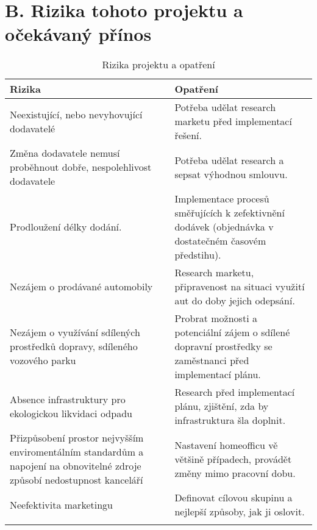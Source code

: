 
\newpage

\section*{B. Rizika tohoto projektu a očekávaný přínos}
\label{sec:Rizika tohoto projektu a ocekavany prinos}

\begin{table}[h]
\centering
\begin{tabularx}{\textwidth}{X|X}
\thickhline
Rizika & Opatření \\ \hline
Neexistující, nebo nevyhovující dodavatelé & Potřeba udělat research marketu před implementací řešení. \\
Změna dodavatele nemusí proběhnout dobře, \newline nespolehlivost dodavatele & Potřeba udělat research a sepsat výhodnou smlouvu. \\
Prodloužení délky dodání. & Implementace procesů směřujících k zefektivnění dodávek (objednávka v dostatečném časovém předstihu). \\
Nezájem o prodávané automobily & Research marketu, připravenost na situaci využití aut do doby jejich odepsání. \\
Nezájem o využívání sdílených prostředků dopravy, sdíleného vozového parku & Probrat možnosti a potenciální zájem o sdílené dopravní prostředky se zaměstnanci před implementací plánu. \\
Absence infrastruktury pro ekologickou likvidaci odpadu & Research před implementací plánu, zjištění, zda by infrastruktura šla doplnit. \\
Přizpůsobení prostor nejvyšším enviromentálním standardům a napojení na obnovitelné zdroje způsobí nedostupnost kanceláří & Nastavení homeofficu vě většině případech, provádět změny mimo pracovní dobu. \\
Neefektivita marketingu & Definovat cílovou skupinu a nejlepší způsoby, jak ji oslovit. \\ \thickhline
\end{tabularx}
\caption{Rizika projektu a opatření}
\label{tab:Rizika projektu a opatreni}
\end{table}